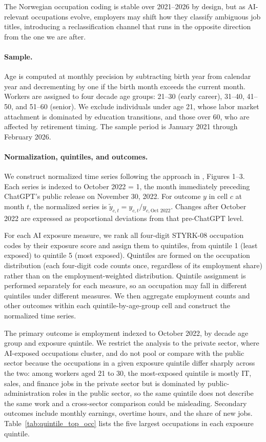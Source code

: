 \documentclass[12pt]{article}
\begin{document}
The Norwegian occupation coding is stable over 2021--2026 by design, but as AI-relevant occupations evolve, employers may shift how they classify ambiguous job titles, introducing a reclassification channel that runs in the opposite direction from the one we are after.

\paragraph{Sample.}
Age is computed at monthly precision by subtracting birth year from calendar year and decrementing by one if the birth month exceeds the current month. Workers are assigned to four decade age groups: 21--30 (early career), 31--40, 41--50, and 51--60 (senior). We exclude individuals under age 21, whose labor market attachment is dominated by education transitions, and those over 60, who are affected by retirement timing. The sample period is January 2021 through February 2026.

\paragraph{Normalization, quintiles, and outcomes.}\label{sec:data:approach}

We construct normalized time series following the approach in \citet{brynjolfsson2025}, Figures 1--3. Each series is indexed to October 2022 = 1, the month immediately preceding ChatGPT's public release on November 30, 2022. For outcome $y$ in cell $c$ at month $t$, the normalized series is $\tilde{y}_{c,t} = y_{c,t} / y_{c,\text{Oct } 2022}$. Changes after October 2022 are expressed as proportional deviations from that pre-ChatGPT level.

For each AI exposure measure, we rank all four-digit STYRK-08 occupation codes by their exposure score and assign them to quintiles, from quintile 1 (least exposed) to quintile 5 (most exposed). Quintiles are formed on the occupation distribution (each four-digit code counts once, regardless of its employment share) rather than on the employment-weighted distribution. Quintile assignment is performed separately for each measure, so an occupation may fall in different quintiles under different measures. We then aggregate employment counts and other outcomes within each quintile-by-age-group cell and construct the normalized time series.

The primary outcome is employment indexed to October 2022, by decade age group and exposure quintile. We restrict the analysis to the private sector, where AI-exposed occupations cluster, and do not pool or compare with the public sector because the occupations in a given exposure quintile differ sharply across the two: among workers aged 21 to 30, the most-exposed quintile is mostly IT, sales, and finance jobs in the private sector but is dominated by public-administration roles in the public sector, so the same quintile does not describe the same work and a cross-sector comparison could be misleading. Secondary outcomes include monthly earnings, overtime hours, and the share of new jobs. Table~\ref{tab:quintile_top_occ} lists the five largest occupations in each exposure quintile.
\end{document}
